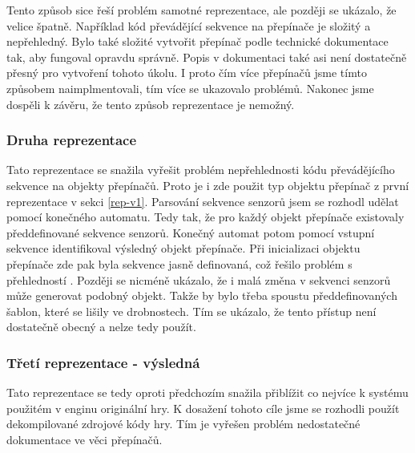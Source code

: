Tento způsob sice řeší problém samotné reprezentace, ale později se ukázalo, že velice špatně. Například
kód převádějící sekvence na přepínače je složitý a nepřehledný. Bylo také složité vytvořit přepínač podle technické dokumentace\cite{TechnicalDocumentationFontanel05}
tak, aby fungoval opravdu správně. Popis v dokumentaci\cite{TechnicalDocumentationFontanel05} také asi není dostatečně přesný pro vytvoření tohoto úkolu.
I proto čím více přepínačů jsme tímto způsobem naimplmentovali, tím více se ukazovalo problémů. Nakonec jsme dospěli k závěru, že tento způsob reprezentace je nemožný.

\subsubsection{Druha reprezentace}

Tato reprezentace se snažila vyřešit problém nepřehlednosti kódu převádějícího sekvence na objekty přepínačů.
Proto je i zde použit typ objektu přepínač z první reprezentace v sekci \ref{rep-v1}. Parsování sekvence senzorů jsem se rozhodl udělat pomocí konečného 
automatu. Tedy tak, že pro každý objekt přepínače existovaly předdefinované sekvence senzorů. Konečný automat potom pomocí vstupní sekvence
identifikoval výsledný objekt přepínače. Při inicializaci objektu přepínače zde pak byla sekvence jasně definovaná, což řešilo problém s přehledností .
Později se nicméně ukázalo, že i malá změna v sekvenci senzorů může generovat podobný objekt. Takže by bylo třeba
spoustu předdefinovaných šablon, které se lišily ve drobnostech. Tím se ukázalo, že tento přístup není dostatečně obecný a nelze tedy použít. 

\subsubsection{Třetí reprezentace - výsledná}

Tato reprezentace se tedy oproti předchozím snažila přiblížit co nejvíce k systému použitém v enginu originální hry.
K dosažení tohoto cíle jsme se rozhodli použít dekompilované zdrojové kódy\cite{DMDecompilation} hry. Tím
je vyřešen problém nedostatečné dokumentace ve věci přepínačů.

